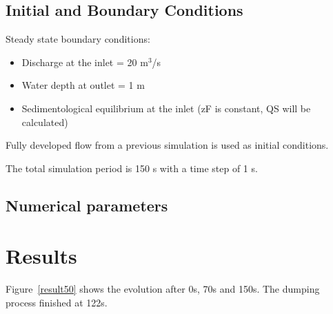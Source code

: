 \subsection{Initial and Boundary Conditions}
%
Steady state boundary conditions:
\begin{itemize}
\item{Discharge at the inlet = 20 m$^3$/s}
\item Water depth at outlet = 1 m
\item Sedimentological equilibrium at the inlet (zF is constant, QS will be calculated)
\end{itemize}
Fully developed flow from a previous simulation is used as initial conditions.

The total simulation period is 150 s with a time step of 1 s.
%
%
\subsection{Numerical parameters}
%
%
%
\section{Results}
%
Figure~\ref{result50} shows the evolution after 0s, 70s and 150s. The dumping process finished at 122s.

